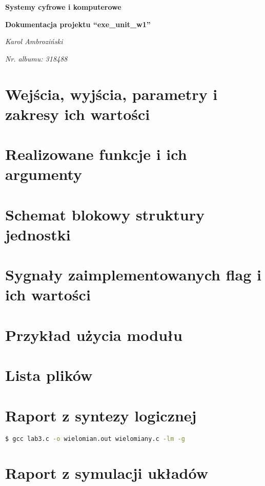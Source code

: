 \documentclass[12pt]{article}
\title{}
\author{}
\date{}
\begin{document}
	\begin{titlepage}
		\centering
		\vspace{1cm}
		{\huge\bfseries Systemy cyfrowe i komputerowe\par}
		\vspace{0.5cm}
		{\huge\bfseries Dokumentacja projektu ``exe\_unit\_w1''\par}
		\vspace{2cm}
		{\Large\itshape Karol Ambroziński\par}
		\vspace{0cm}
		{\Large\itshape Nr. albumu: 318488\par}
		\vfill
	\end{titlepage}

	\tableofcontents
	
	\newpage
	
	\section{Wejścia, wyjścia, parametry i zakresy ich wartości}
	
	
	
	\section{Realizowane funkcje i ich argumenty}

	
	
	\section{Schemat blokowy struktury jednostki}
	
	
	
	\section{Sygnały zaimplementowanych flag i ich wartości}
	
	

	\newpage

	\section{Przykład użycia modułu}
	
	\section{Lista plików}
	
	\section{Raport z syntezy logicznej}
	\begin{lstlisting}[language=bash, style=rm]
		$ gcc lab3.c -o wielomian.out wielomiany.c -lm -g
	\end{lstlisting}
	\section{Raport z symulacji układów}
	\blindtext
	
\end{document}
